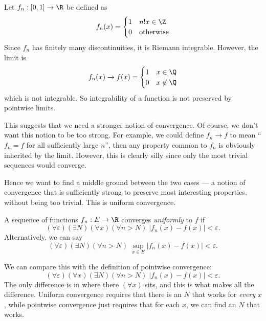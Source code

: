 \documentclass[a4paper]{article}
\begin{document}
\begin{eg}
  Let $f_n: [0, 1] \to \R$ be defined as
  \[
    f_n (x) =
    \begin{cases}
      1 & n!x \in \Z\\
      0 & \text{otherwise}
    \end{cases}
  \]
  Since $f_n$ has finitely many discontinuities, it is Riemann integrable. However, the limit is
  \[
    f_n(x) \to f(x) =
    \begin{cases}
      1 & x\in \Q\\
      0 & x\not\in \Q
    \end{cases}
  \]
  which is not integrable. So integrability of a function is not preserved by pointwise limits.
\end{eg}
This suggests that we need a stronger notion of convergence. Of course, we don't want this notion to be too strong. For example, we could define $f_n \to f$ to mean ``$f_n = f$ for all sufficiently large $n$'', then any property common to $f_n$ is obviously inherited by the limit. However, this is clearly silly since only the most trivial sequences would converge.

Hence we want to find a middle ground between the two cases --- a notion of convergence that is sufficiently strong to preserve most interesting properties, without being too trivial. This is uniform convergence.

\begin{defi}
  A sequence of functions $f_n: E\to \R$ converges \emph{uniformly} to $f$ if
  \[
    (\forall \varepsilon)(\exists N)(\forall x)(\forall n > N)\; |f_n(x) - f(x)| < \varepsilon.
  \]
  Alternatively, we can say
  \[
    (\forall \varepsilon)(\exists N)(\forall n > N)\; \sup_{x\in E} |f_n(x) - f(x)| < \varepsilon.
  \]
\end{defi}
We can compare this with the definition of pointwise convergence:
\[
  (\forall \varepsilon)(\forall x)(\exists N)(\forall n > N)\; |f_n(x) - f(x)| < \varepsilon.
\]
The only difference is in where there $(\forall x)$ sits, and this is what makes all the difference. Uniform convergence requires that there is an $N$ that works for \emph{every} $x$, while pointwise convergence just requires that for each $x$, we can find an $N$ that works.
\end{document}
